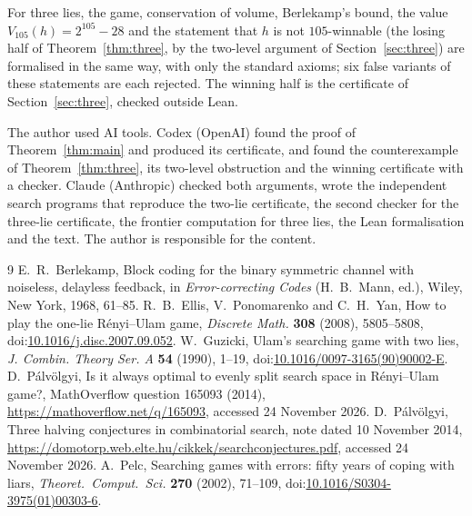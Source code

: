 \documentclass[11pt]{amsart}
\newcommand{\doi}[1]{doi:\href{https://doi.org/#1}{#1}}
\theoremstyle{definition}
\begin{document}
For three lies, the game, conservation of volume, Berlekamp's bound, the value $V_{105}(h)=2^{105}-28$ and the
statement that $h$ is not $105$-winnable (the losing half of Theorem~\ref{thm:three}, by the two-level argument of
Section~\ref{sec:three}) are formalised in the same way, with only the standard axioms; six false variants of these
statements are each rejected. The winning half is the certificate of Section~\ref{sec:three}, checked outside Lean.

The author used AI tools. Codex (OpenAI) found the proof of Theorem~\ref{thm:main} and produced its certificate,
and found the counterexample of Theorem~\ref{thm:three}, its two-level obstruction and the winning certificate with a
checker. Claude (Anthropic) checked both arguments, wrote the independent search programs that reproduce the
two-lie certificate, the second checker for the three-lie certificate, the frontier computation for three lies, the
Lean formalisation and the text. The author is responsible for the content.

\begin{thebibliography}{9}
 E.~R.~Berlekamp, Block coding for the binary symmetric channel with noiseless, delayless
feedback, in \emph{Error-correcting Codes} (H.~B.~Mann, ed.), Wiley, New York, 1968, 61--85.
 R.~B.~Ellis, V.~Ponomarenko and C.~H.~Yan, How to play the one-lie R\'enyi--Ulam game,
\emph{Discrete Math.} \textbf{308} (2008), 5805--5808, \doi{10.1016/j.disc.2007.09.052}.
 W.~Guzicki, Ulam's searching game with two lies, \emph{J. Combin. Theory Ser. A} \textbf{54}
(1990), 1--19, \doi{10.1016/0097-3165(90)90002-E}.
 D.~P\'alv\"olgyi, Is it always optimal to evenly split search space in R\'enyi--Ulam game?,
MathOverflow question 165093 (2014), \url{https://mathoverflow.net/q/165093}, accessed 24 November 2026.
 D.~P\'alv\"olgyi, Three halving conjectures in combinatorial search, note dated 10 November
2014, \url{https://domotorp.web.elte.hu/cikkek/searchconjectures.pdf}, accessed 24 November 2026.
 A.~Pelc, Searching games with errors: fifty years of coping with liars, \emph{Theoret.\ Comput.\
Sci.} \textbf{270} (2002), 71--109, \doi{10.1016/S0304-3975(01)00303-6}.
\end{thebibliography}
\end{document}
